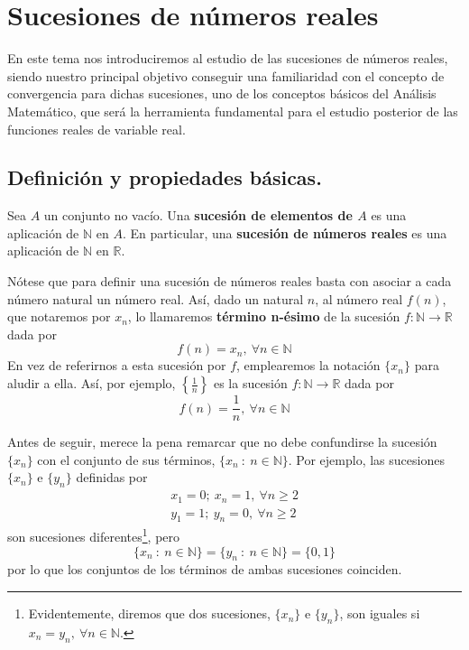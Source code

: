 \chapter{Sucesiones de números reales}\label{chp:Tema5}

En este tema nos introduciremos al estudio de las sucesiones de números reales, siendo nuestro principal objetivo conseguir una familiaridad con el concepto de convergencia para dichas sucesiones, uno de los conceptos básicos del Análisis Matemático, que será la herramienta fundamental para el estudio posterior de las funciones reales de variable real.



\section{Definición y propiedades básicas.}
\begin{definicion}
    Sea $A$ un conjunto no vacío. Una \textbf{sucesión de elementos de $A$} es una aplicación de $\mathbb{N}$ en $A$. En particular, una \textbf{sucesión de números reales} es una aplicación de $\mathbb{N}$ en $\mathbb{R}$.
\end{definicion}

Nótese que para definir una sucesión de números reales basta con asociar a cada número natural un número real. 
Así, dado un natural $n$, al número real $f(n)$, que notaremos por $x_n$, lo llamaremos \textbf{término n-ésimo} de la sucesión $f:\mathbb{N} \longrightarrow \mathbb{R}$ dada por
\begin{equation*}
    f(n)=x_n,~\forall n \in \mathbb{N}
\end{equation*}
En vez de referirnos a esta sucesión por $f$, emplearemos la notación $\{x_n\}$ para aludir a ella.
Así, por ejemplo, $\left\{\frac{1}{n}\right\}$ es la sucesión $f:\mathbb{N} \longrightarrow \mathbb{R}$ dada por
\begin{equation*}
    f(n)=\frac{1}{n},~\forall n \in \mathbb{N}
\end{equation*}

Antes de seguir, merece la pena remarcar que no debe confundirse la sucesión $\{x_n\}$ con el conjunto
de sus términos, $\{x_n~:~n \in \mathbb{N}\}$. Por ejemplo, las sucesiones $\{x_n\}$ e $\{y_n\}$ definidas
por
\begin{gather*}
    x_1 = 0;~x_n = 1,~\forall n \geq 2\\
    y_1 = 1;~y_n = 0,~\forall n \geq 2
\end{gather*}
son sucesiones diferentes\footnote{Evidentemente, diremos que dos sucesiones, $\{x_n\}$ e $\{y_n\}$,
son iguales si $x_n = y_n,~\forall n \in \mathbb{N}$.}, pero
\begin{equation*}
    \{x_n~:~n \in \mathbb{N}\} = \{y_n~:~n \in \mathbb{N}\} = \{0,1\}
\end{equation*}
por lo que los conjuntos de los términos de ambas sucesiones coinciden.

